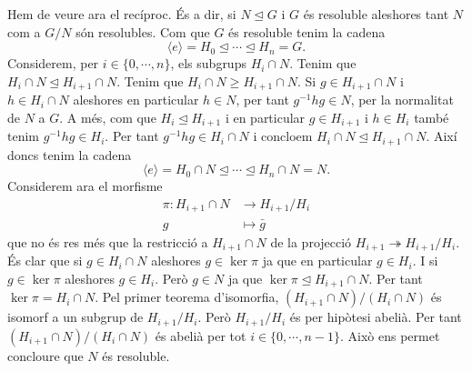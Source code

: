 \documentclass[12pt]{article}
\newcommand{\gen}[1]{\langle #1 \rangle}
\newcommand{\normal}{\trianglelefteq}
\begin{document}
Hem de veure ara el recíproc. És a dir, si \( N \normal G \) i \( G \) és resoluble aleshores tant \( N \) com a \( G/N \) són resolubles. Com que \( G \) és resoluble tenim la cadena
\begin{equation*}
	\gen{e} = H_0 \normal \cdots \normal H_n = G.
\end{equation*}
Considerem, per \( i \in \{0, \cdots , n \} \), els subgrups \( H_i \cap N \). Tenim que \( H_i \cap N \normal H_{i+1} \cap N \). Tenim que \( H_i \cap N \geq H_{i+1} \cap N \). Si \( g \in H_{i+1} \cap N \) i \( h \in H_i \cap N \) aleshores en particular \( h \in N \), per tant \(  g^{-1}hg \in N \), per la normalitat de \( N \) a \( G \). A més, com que \( H_i \normal H_{i+1} \) i en particular \( g \in H_{i+1} \) i \( h \in H_i \) també tenim \( g^{-1}hg \in H_i \). Per tant \( g^{-1}hg \in H_{i} \cap N \) i concloem \( H_{i} \cap N \normal H_{i+1} \cap N \). Així doncs tenim la cadena
\begin{equation*}
	\gen{e} = H_0 \cap N \normal \cdots \normal H_n \cap N = N.
\end{equation*}
Considerem ara el morfisme
\begin{align*}
	\pi \colon H_{i+1} \cap N & \longrightarrow H_{i+1}/H_i \\
	g & \longmapsto \bar{g}
\end{align*}
que no és res més que la restricció a \( H_{i+1} \cap N \) de la projecció \( H_{i+1} \twoheadrightarrow H_{i+1}/H_{i} \). És clar que si \( g \in H_i \cap N \) aleshores \( g \in \ker \pi \) ja que en particular \( g \in H_i \). I si \( g \in \ker \pi \) aleshores \( g \in H_i \). Però \( g \in N \) ja que \( \ker \pi \normal H_{i+1} \cap N \). Per tant \( \ker \pi = H_i \cap N \). Pel primer teorema d'isomorfia, \( (H_{i+1} \cap N) / (H_i \cap N) \) és isomorf a un subgrup de \( H_{i+1}/H_i \). Però \( H_{i+1}/H_i \) és per hipòtesi abelià. Per tant \( (H_{i+1} \cap N) / (H_i \cap N) \) és abelià per tot \( i \in \{0, \cdots, n-1\} \). Això ens permet concloure que \( N \) és resoluble.  
\end{document}

